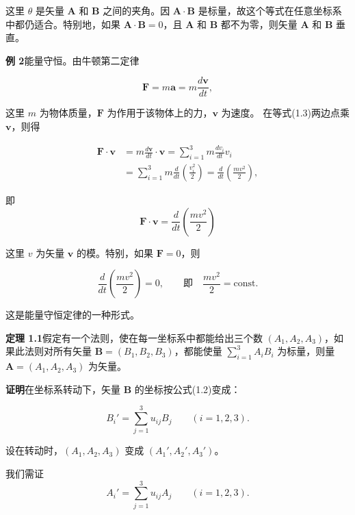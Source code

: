 \documentclass[11pt,a4paper,oneside]{ctexbook}
\newcommand{\ve}[1]{\bm{#1}}
\begin{document}
这里 $\theta$ 是矢量 $\ve{A}$ 和 $\ve{B}$ 之间的夹角。因 $\ve{A} \cdot \ve{B}$ 是标量，故这个等式在任意坐标系中都仍适合。特别地，如果 $\ve{A} \cdot \ve{B} = 0$，且 $\ve{A}$ 和 $\ve{B}$ 都不为零，则矢量 $\ve{A}$ 和 $\ve{B}$ 垂直。

\textbf{例 2}\quad 能量守恒。由牛顿第二定律

\begin{equation}
\ve{F} = m \ve{a} = m \frac{d\ve{v}}{dt},
\tag{1.3}
\end{equation}

这里 $m$ 为物体质量，$\ve{F}$ 为作用于该物体上的力，$\ve{v}$ 为速度。
在等式(1.3)两边点乘 $\ve{v}$，则得

\begin{equation*}
\begin{aligned}
\ve{F} \cdot \ve{v}
&= m \frac{d\ve{v}}{dt} \cdot \ve{v} = \sum_{i=1}^{3} m \frac{dv_i}{dt} v_i\\
&= \sum_{i=1}^{3} m \frac{d}{dt} \left(\frac{v_i^{2}}{2}\right) = \frac{d}{dt} \left(\frac{m v^{2}}{2}\right),
\end{aligned}
\end{equation*}

即
\begin{equation*}
\ve{F} \cdot \ve{v} = \frac{d}{dt} \left(\frac{m v^{2}}{2}\right)
\end{equation*}

这里 $v$ 为矢量 $\ve{v}$ 的模。特别，如果 $\ve{F} = 0$，则

\begin{equation*}
\frac{d}{dt} \left(\frac{m v^{2}}{2}\right) = 0, \qquad \text{即} \quad \frac{m v^{2}}{2} = \mathrm{const}.
\end{equation*}

这是能量守恒定律的一种形式。

\textbf{定理 1.1}\quad 假定有一个法则，使在每一坐标系中都能给出三个数 $(A_1, A_2, A_3)$，如果此法则对所有矢量 $\ve{B} = (B_1, B_2, B_3)$，都能使量 $\sum_{i=1}^{3} A_i B_i$ 为标量，则量 $\ve{A} = (A_1, A_2, A_3)$ 为矢量。

\textbf{证明}\quad 在坐标系转动下，矢量 $\ve{B}$ 的坐标按公式(1.2)变成：

\begin{equation*}
B_i' = \sum_{j=1}^{3} u_{ij} B_j \qquad (i = 1, 2, 3).
\end{equation*}

设在转动时，$(A_1, A_2, A_3)$ 变成 $(A_1', A_2', A_3')$。

我们需证
\begin{equation*}
A_i' = \sum_{j=1}^{3} u_{ij} A_j \qquad (i = 1, 2, 3).
\end{equation*}
\end{document}
